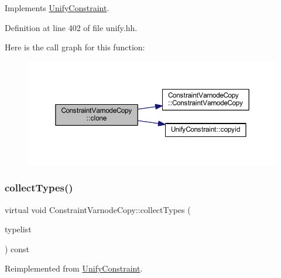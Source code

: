 Implements \mbox{\hyperlink{class_unify_constraint_a4f068343932637d355644bb21559aa12}{Unify\+Constraint}}.



Definition at line 402 of file unify.\+hh.

Here is the call graph for this function\+:
\nopagebreak
\begin{figure}[H]
\begin{center}
\leavevmode
\includegraphics[width=350pt]{class_constraint_varnode_copy_a8334114ed67c5c1e1d7655d9b69bb603_cgraph}
\end{center}
\end{figure}
\mbox{\label{class_constraint_varnode_copy_a0464a597c40914b39af05ed2099a52b6}} 
\subsubsection{\texorpdfstring{collectTypes()}{collectTypes()}}
{\footnotesize\ttfamily virtual void Constraint\+Varnode\+Copy\+::collect\+Types (\begin{DoxyParamCaption}\item[{vector$<$ \mbox{\hyperlink{class_unify_datatype}{Unify\+Datatype}} $>$ \&}]{typelist }\end{DoxyParamCaption}) const\hspace{0.3cm}{\ttfamily [virtual]}}



Reimplemented from \mbox{\hyperlink{class_unify_constraint_acb83b6bea3b21e13054e72ac9cfaba0f}{Unify\+Constraint}}.

\mbox{\label{class_constraint_varnode_copy_a6f2879e4817ed326cf7c81090f615881}} 
